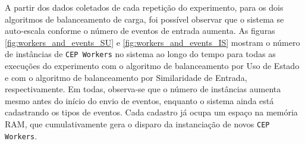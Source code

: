 




A partir dos dados coletados de cada repetição do experimento, para os dois algoritmos de balanceamento de carga, foi possível observar que o sistema se auto-escala conforme o número de eventos de entrada aumenta. As figuras \ref{fig:workers_and_events_SU}  e \ref{fig:workers_and_events_IS} mostram o número de instâncias de \texttt{CEP Workers} no sistema ao longo do tempo para todas as execuções do experimento com o algoritmo de balanceamento por Uso de Estado e com o algoritmo de balanceamento por Similaridade de Entrada, respectivamente. 
Em todas, observa-se que o número de instâncias aumenta mesmo antes do início do envio de eventos, enquanto o sistema ainda está cadastrando os tipos de eventos. Cada cadastro já ocupa um espaço na memória RAM, que cumulativamente gera o disparo da instanciação de novos \texttt{CEP Workers}.

